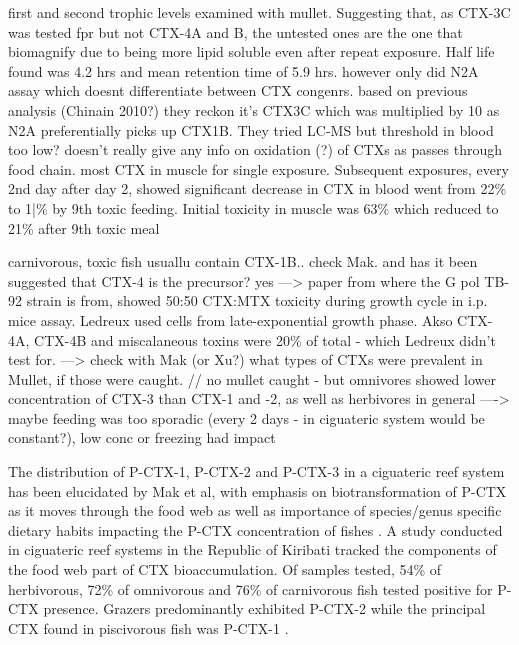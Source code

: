 \documentclass[12pt]{article}
\begin{document}
 first and second trophic levels examined with mullet. Suggesting that, as CTX-3C was tested fpr but not CTX-4A and B, the untested ones are the one that biomagnify due to being more lipid soluble
even after repeat exposure. Half life found was 4.2 hrs and mean retention time of 5.9 hrs. however only did N2A assay which doesnt differentiate between CTX congenrs. based on previous analysis (Chinain 2010?) they reckon it's CTX3C which was multiplied by 10 as  N2A preferentially picks up CTX1B. They tried LC-MS but threshold in blood too low? doesn't really give any info on oxidation (?) of CTXs as passes through food chain.
most CTX in muscle  for single exposure. Subsequent exposures, every 2nd day after day 2, showed significant decrease in CTX in blood went from 22\% to 1|\% by 9th toxic feeding. Initial toxicity in muscle was 63\% which reduced to 21\% after 9th toxic meal

carnivorous, toxic fish usuallu contain CTX-1B.. check Mak. and has it been suggested that CTX-4 is the precursor? yes \cite{murata1990structures}
---> \citep{chinain2010growth} paper from where the G pol TB-92 strain is from, showed 50:50 CTX:MTX toxicity during growth cycle in i.p. mice assay. Ledreux used cells from late-exponential growth phase. Akso CTX-4A, CTX-4B and miscalaneous toxins were 20\% of total - which Ledreux didn't test for.
---> check with Mak (or Xu?) what types of CTXs were prevalent in Mullet, if those were caught. // no mullet caught - but omnivores showed lower concentration of CTX-3 than CTX-1 and -2, as well as herbivores in general 
----> maybe feeding was too sporadic (every 2 days - in ciguateric system would be constant?), low conc or freezing had impact

The distribution of P-CTX-1, P-CTX-2 and P-CTX-3 in a ciguateric reef system has been elucidated by Mak et al, with emphasis on biotransformation of P-CTX as it moves through the food web as well as importance of species/genus specific dietary habits impacting the P-CTX concentration of fishes \cite{mak2013pacific}.
A study conducted in ciguateric reef systems in the Republic of Kiribati tracked the components of the food web part of CTX bioaccumulation. Of samples tested, 54\% of herbivorous, 72\% of omnivorous and 76\% of carnivorous fish tested positive for P-CTX presence. Grazers predominantly exhibited P-CTX-2 while the principal CTX found in piscivorous fish was P-CTX-1 \cite{mak2013pacific}.
\end{document}
